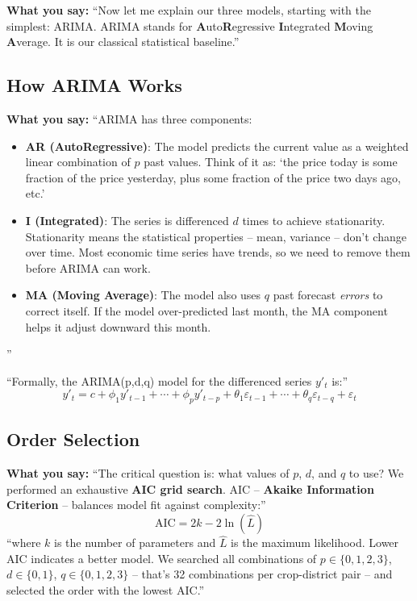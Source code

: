 \documentclass[11pt,a4paper]{article}
\begin{document}
\textbf{What you say:}
``Now let me explain our three models, starting with the simplest: ARIMA. ARIMA stands for \textbf{A}uto\textbf{R}egressive \textbf{I}ntegrated \textbf{M}oving \textbf{A}verage. It is our classical statistical baseline.''

\subsection{How ARIMA Works}
\textbf{What you say:}
``ARIMA has three components:
\begin{itemize}
    \item \textbf{AR (AutoRegressive)}: The model predicts the current value as a weighted linear combination of $p$ past values. Think of it as: `the price today is some fraction of the price yesterday, plus some fraction of the price two days ago, etc.'
    \item \textbf{I (Integrated)}: The series is differenced $d$ times to achieve stationarity. Stationarity means the statistical properties -- mean, variance -- don't change over time. Most economic time series have trends, so we need to remove them before ARIMA can work.
    \item \textbf{MA (Moving Average)}: The model also uses $q$ past forecast \textit{errors} to correct itself. If the model over-predicted last month, the MA component helps it adjust downward this month.
\end{itemize}''

``Formally, the ARIMA(p,d,q) model for the differenced series $y'_t$ is:''
$$y'_t = c + \phi_1 y'_{t-1} + \cdots + \phi_p y'_{t-p} + \theta_1 \varepsilon_{t-1} + \cdots + \theta_q \varepsilon_{t-q} + \varepsilon_t$$

\subsection{Order Selection}
\textbf{What you say:}
``The critical question is: what values of $p$, $d$, and $q$ to use? We performed an exhaustive \textbf{AIC grid search}. AIC -- \textbf{Akaike Information Criterion} -- balances model fit against complexity:''
$$\text{AIC} = 2k - 2\ln(\hat{L})$$
``where $k$ is the number of parameters and $\hat{L}$ is the maximum likelihood. Lower AIC indicates a better model. We searched all combinations of $p \in \{0,1,2,3\}$, $d \in \{0,1\}$, $q \in \{0,1,2,3\}$ -- that's 32 combinations per crop-district pair -- and selected the order with the lowest AIC.''
\end{document}
